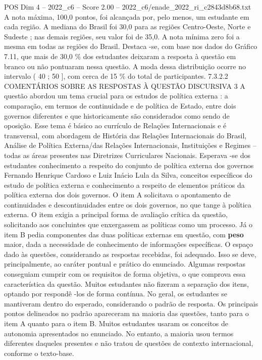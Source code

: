 \begin{textsample}{POS Dim 4 – 2022\_c6 – Score 2.00 – 2022\_c6/enade\_2022\_ri\_c2843d8b68.txt}
A nota máxima, 100,0 pontos, foi alcançada por, pelo menos, um estudante em cada região.
A mediana do Brasil foi 30,0 para as regiões Centro-Oeste, Norte e Sudeste ; nas demais regiões, seu valor foi de 35,0.
A nota mínima zero foi a mesma em todas as regiões do Brasil.
Destaca -se, com base nos dados do Gráfico 7.11, que mais de 30,0 \% dos estudantes deixaram a resposta à questão em branco ou não pontuaram nessa questão.
A moda dessa distribuição ocorre no intervalo ( 40 ; 50 ], com cerca de 15 \% do total de participantes. 7.3.2.2 COMENTÁRIOS SOBRE AS RESPOSTAS À QUESTÃO DISCURSIVA 3 A questão abordou um tema crucial para os estudos de política externa : a comparação, em termos de continuidade e de política de Estado, entre dois governos diferentes e que historicamente são considerados como sendo de oposição.
Esse tema é básico ao currículo de Relações Internacionais e é transversal, com abordagem de História das Relações Internacionais do Brasil, Análise de Política Externa/das Relações Internacionais, Instituições e Regimes – todas as áreas presentes nas Diretrizes Curriculares Nacionais.
Esperava -se dos estudantes conhecimento a respeito do conjunto de política externa dos governos Fernando Henrique Cardoso e Luiz Inácio Lula da Silva, conceitos específicos do estudo de política externa e conhecimento a respeito de elementos práticos da política externa dos dois governos.
O item A solicitava o apontamento de continuidades e descontinuidades entre os dois governos, no que tange à política externa.
O item exigia a principal forma de avaliação crítica da questão, solicitando aos concluintes que enxergassem as políticas como um processo.
Já o item B pedia componentes das duas políticas externas em questão, com \textbf{peso} maior, dada a necessidade de conhecimento de informações específicas.
O espaço dado às questões, considerando as respostas recebidas, foi adequado.
Isso se deve, principalmente, ao caráter pontual e prático do enunciado.
Algumas respostas conseguiam cumprir com os requisitos de forma objetiva, o que comprova essa característica da questão.
Muitos estudantes não fizeram a separação dos itens, optando por respondê -los de forma contínua.
No geral, os estudantes se mantiveram dentro do esperado, considerando o padrão de resposta.
Os principais pontos delineados no padrão apareceram na maioria das questões, tanto para o item A quanto para o item B.
Muitos estudantes usaram os conceitos de autonomia apresentados no enunciado.
No entanto, a maioria usou termos diferentes daqueles presentes e não tratou de questões de contexto internacional, conforme o texto-base.

\end{textsample}
